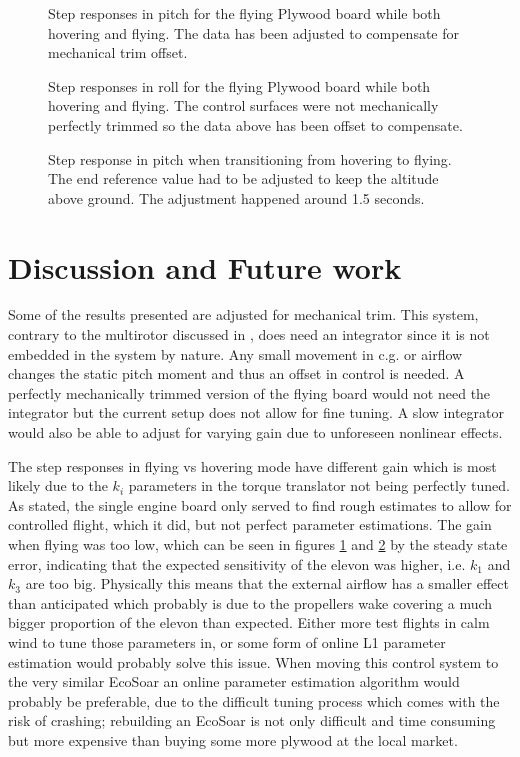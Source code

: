 \documentclass{article}
\begin{document}
\begin{figure}[]
    \centering
    
    \caption{Step responses in pitch for the flying Plywood board while both hovering and flying. The data has been adjusted to compensate for mechanical trim offset.}
    \label{fig:pitchstep}
\end{figure}

\begin{figure}[]
    
    \caption{Step responses in roll for the flying Plywood board while both hovering and flying. The control surfaces were not mechanically perfectly trimmed so the data above has been offset to compensate.}
    \label{fig:rollstep}
\end{figure}

\begin{figure}[]
    
    \caption{Step response in pitch when transitioning from hovering to flying. The end reference value had to be adjusted to keep the altitude above ground. The adjustment happened around 1.5 seconds.}
    \label{fig:transition}
\end{figure}



\section{Discussion and Future work}

Some of the results presented are adjusted for mechanical trim.
This system, contrary to the multirotor discussed in \cite{P2}, does need an integrator since it is not embedded in the system by nature.
Any small movement in c.g. or airflow changes the static pitch moment and thus an offset in control is needed.
A perfectly mechanically trimmed version of the flying board would not need the integrator but the current setup does not allow for fine tuning.
A slow integrator would also be able to adjust for varying gain due to unforeseen nonlinear effects.

The step responses in flying vs hovering mode have different gain which is most likely due to the $k_i$ parameters in the torque translator not being perfectly tuned.
As stated, the single engine board only served to find rough estimates to allow for controlled flight, which it did, but not perfect parameter estimations.
The gain when flying was too low, which can be seen in figures \ref{fig:pitchstep} and \ref{fig:rollstep} by the steady state error, indicating that the expected sensitivity of the elevon was higher, i.e. $k_1$ and $k_3$ are too big.
Physically this means that the external airflow has a smaller effect than anticipated which probably is due to the propellers wake covering a much bigger proportion of the elevon than expected.
Either more test flights in calm wind to tune those parameters in, or some form of online L1 parameter estimation would probably solve this issue.
When moving this control system to the very similar EcoSoar an online parameter estimation algorithm would probably be preferable, due to the difficult tuning process which comes with the risk of crashing; rebuilding an EcoSoar is not only difficult and time consuming but more expensive than buying some more plywood at the local market.
\end{document}
